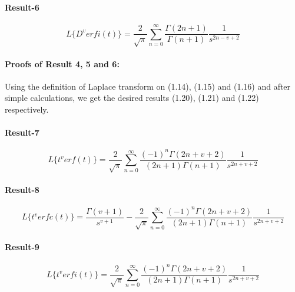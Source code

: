 \documentclass[leqno]{article}
\begin{document}
\paragraph{Result-6}
\begin{equation}
    L\big\{{D^v}erfi(t)\big\} = 
    \frac{2}{\sqrt{\pi}}
    \sum_{n = 0}^{\infty}
    \frac{\Gamma{(2n+1)}}{\Gamma{(n+1)}}
    \frac{1}{s^{2n-v+2}}
\end{equation}
\paragraph{Proofs of Result 4, 5 and 6:}
Using the definition of Laplace transform on (1.14), (1.15) and (1.16) and after simple calculations, we get the desired results (1.20), (1.21) and (1.22) respectively.

\paragraph{Result-7}
\begin{equation}
    L\big\{{t^v}erf(t)\big\} = 
    \frac{2}{\sqrt{\pi}}
    \sum_{n = 0}^{\infty}
    \frac{{(-1)}^n\Gamma{(2n+v+2)}}{(2n+1)\Gamma{(n+1)}}
    \frac{1}{s^{2n+v+2}}
\end{equation}
\paragraph{Result-8\\}
\begin{equation}
    L\big\{{t^v}erfc(t)\big\}=
    \frac{\Gamma{(v+1)}}{s^{v+1}}
    -\frac{2}{\sqrt{\pi}}
    \sum_{n = 0}^{\infty}
    \frac{{(-1)}^n\Gamma{(2n+v+2)}}{(2n+1)\Gamma{(n+1)}}
    \frac{1}{s^{2n+v+2}}
\end{equation}
\paragraph{Result-9}
\begin{equation}
    L\big\{{t^v}erfi(t)\big\} = 
    \frac{2}{\sqrt{\pi}}
    \sum_{n = 0}^{\infty}
    \frac{{(-1)}^n\Gamma{(2n+v+2)}}{(2n+1)\Gamma{(n+1)}}
    \frac{1}{s^{2n+v+2}}
\end{equation}
\end{document}
